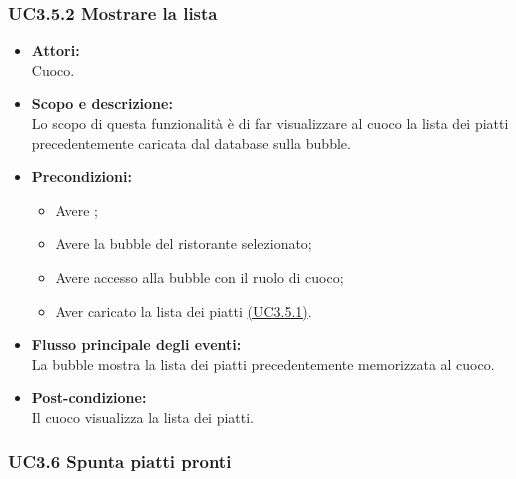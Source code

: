 \subsubsection{UC3.5.2 Mostrare la lista} \label{UC3.5.2}

\begin{itemize}
	\item \textbf{Attori:}
	\\Cuoco.
	\item \textbf{Scopo e descrizione:} 
	\\Lo scopo di questa funzionalità è di far visualizzare al cuoco la lista dei piatti precedentemente caricata dal database sulla bubble.
	\item \textbf{Precondizioni:}
	\begin{itemize}
		\item Avere ;
		\item Avere la bubble del ristorante selezionato;
		\item Avere accesso alla bubble con il ruolo di cuoco;
		\item Aver caricato la lista dei piatti \hyperref[UC3.5.1]{(UC3.5.1)}.
	\end{itemize}
	\item \textbf{Flusso principale degli eventi:}
	\\La bubble mostra la lista dei piatti precedentemente memorizzata al cuoco.
	\item \textbf{Post-condizione:}
	\\Il cuoco visualizza la lista dei piatti.
\end{itemize}

\subsubsection{UC3.6 Spunta piatti pronti} \label{UC3.5}

